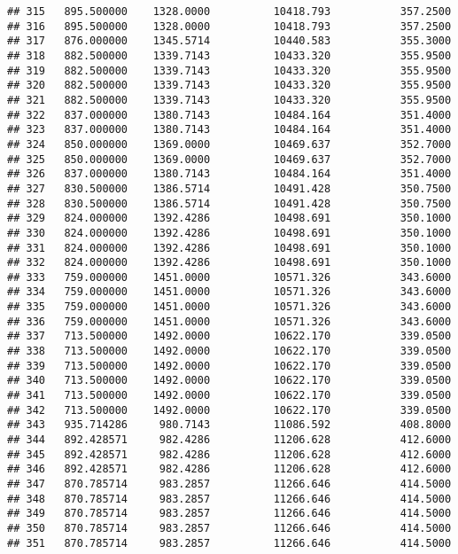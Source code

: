 \documentclass[]{article}
\begin{document}
\begin{verbatim}
## 315   895.500000    1328.0000          10418.793           357.2500
## 316   895.500000    1328.0000          10418.793           357.2500
## 317   876.000000    1345.5714          10440.583           355.3000
## 318   882.500000    1339.7143          10433.320           355.9500
## 319   882.500000    1339.7143          10433.320           355.9500
## 320   882.500000    1339.7143          10433.320           355.9500
## 321   882.500000    1339.7143          10433.320           355.9500
## 322   837.000000    1380.7143          10484.164           351.4000
## 323   837.000000    1380.7143          10484.164           351.4000
## 324   850.000000    1369.0000          10469.637           352.7000
## 325   850.000000    1369.0000          10469.637           352.7000
## 326   837.000000    1380.7143          10484.164           351.4000
## 327   830.500000    1386.5714          10491.428           350.7500
## 328   830.500000    1386.5714          10491.428           350.7500
## 329   824.000000    1392.4286          10498.691           350.1000
## 330   824.000000    1392.4286          10498.691           350.1000
## 331   824.000000    1392.4286          10498.691           350.1000
## 332   824.000000    1392.4286          10498.691           350.1000
## 333   759.000000    1451.0000          10571.326           343.6000
## 334   759.000000    1451.0000          10571.326           343.6000
## 335   759.000000    1451.0000          10571.326           343.6000
## 336   759.000000    1451.0000          10571.326           343.6000
## 337   713.500000    1492.0000          10622.170           339.0500
## 338   713.500000    1492.0000          10622.170           339.0500
## 339   713.500000    1492.0000          10622.170           339.0500
## 340   713.500000    1492.0000          10622.170           339.0500
## 341   713.500000    1492.0000          10622.170           339.0500
## 342   713.500000    1492.0000          10622.170           339.0500
## 343   935.714286     980.7143          11086.592           408.8000
## 344   892.428571     982.4286          11206.628           412.6000
## 345   892.428571     982.4286          11206.628           412.6000
## 346   892.428571     982.4286          11206.628           412.6000
## 347   870.785714     983.2857          11266.646           414.5000
## 348   870.785714     983.2857          11266.646           414.5000
## 349   870.785714     983.2857          11266.646           414.5000
## 350   870.785714     983.2857          11266.646           414.5000
## 351   870.785714     983.2857          11266.646           414.5000

\end{verbatim}
\end{document}
